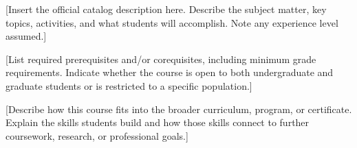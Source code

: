 [Insert the official catalog description here. Describe the subject matter, key topics, activities, and what students will accomplish. Note any experience level assumed.]

[List required prerequisites and/or corequisites, including minimum grade requirements. Indicate whether the course is open to both undergraduate and graduate students or is restricted to a specific population.]

[Describe how this course fits into the broader curriculum, program, or certificate. Explain the skills students build and how those skills connect to further coursework, research, or professional goals.]
